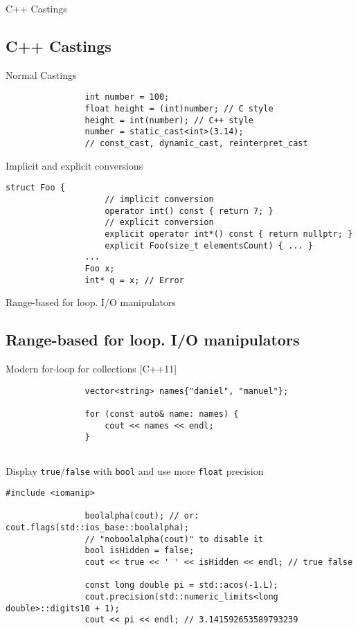 \documentclass{beamer}
\newcommand{\normalSizeItem}[1] {
  \normalsize{\item #1}
}
\begin{document}
		\begin{frame}[fragile]{C++ Castings}	
			\subsection{C++ Castings}		
			\begin{itemize}
			
				\normalSizeItem { Normal Castings }
				\begin{lstlisting}
				int number = 100;
				float height = (int)number; // C style
				height = int(number); // C++ style
				number = static_cast<int>(3.14);
				// const_cast, dynamic_cast, reinterpret_cast
				\end{lstlisting}
				
				\normalSizeItem { Implicit and explicit conversions }
				\begin{lstlisting}[basicstyle={\tiny\ttfamily}]
				struct Foo {
					// implicit conversion
					operator int() const { return 7; } 
					// explicit conversion
					explicit operator int*() const { return nullptr; }   
					explicit Foo(size_t elementsCount) { ... }
				...
				Foo x;
				int* q = x; // Error
				\end{lstlisting}
				
			\end{itemize}
		\end{frame}
		
		\begin{frame}[fragile]{Range-based for loop. I/O manipulators}	
			\subsection{Range-based for loop. I/O manipulators}		
			\begin{itemize}
			
				\normalSizeItem { Modern for-loop for collections [C++11] }
				\begin{lstlisting}
				vector<string> names{"daniel", "manuel"};
				
				for (const auto& name: names) {
					cout << names << endl;
				}
				
				\end{lstlisting}
				
				\normalSizeItem { Display \texttt{true}/\texttt{false} with \texttt{bool} and use more \texttt{float} precision }
				\begin{lstlisting}[basicstyle={\tiny\ttfamily}]
				#include <iomanip>
				
				boolalpha(cout); // or: cout.flags(std::ios_base::boolalpha);
				// "noboolalpha(cout)" to disable it
				bool isHidden = false;
				cout << true << ' ' << isHidden << endl; // true false
				
				const long double pi = std::acos(-1.L);
				cout.precision(std::numeric_limits<long double>::digits10 + 1);
				cout << pi << endl; // 3.141592653589793239
				\end{lstlisting}
				
			\end{itemize}
		\end{frame}
		
\end{document}
